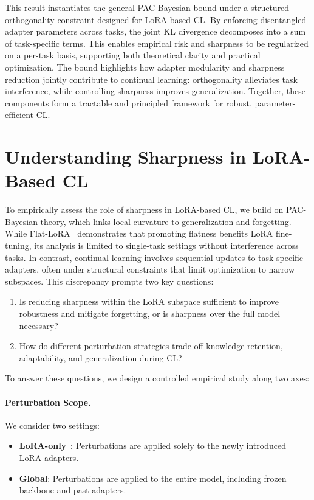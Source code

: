 \documentclass[letterpaper]{article} %
\begin{document}
This result instantiates the general PAC-Bayesian bound under a structured orthogonality constraint designed for LoRA-based CL. By enforcing disentangled adapter parameters across tasks, the joint KL divergence decomposes into a sum of task-specific terms. This enables empirical risk and sharpness to be regularized on a per-task basis, supporting both theoretical clarity and practical optimization. The bound highlights how adapter modularity and sharpness reduction jointly contribute to continual learning: orthogonality alleviates task interference, while controlling sharpness improves generalization. Together, these components form a tractable and principled framework for robust, parameter-efficient CL.


\section{Understanding Sharpness in LoRA-Based CL}
\label{sec:Understanding Flatness in LoRA-Based CL}


To empirically assess the role of sharpness in LoRA-based CL, we build on PAC-Bayesian theory, which links local curvature to generalization and forgetting. While Flat-LoRA~\cite{li2025flatloralowrankadaptationflat} demonstrates that promoting flatness benefits LoRA fine-tuning, its analysis is limited to single-task settings without interference across tasks. In contrast, continual learning involves sequential updates to task-specific adapters, often under structural constraints that limit optimization to narrow subspaces. This discrepancy prompts two key questions:
\begin{enumerate}
    \item Is reducing sharpness within the LoRA subspace sufficient to improve robustness and mitigate forgetting, or is sharpness over the full model necessary?
    \item How do different perturbation strategies trade off knowledge retention, adaptability, and generalization during CL?
\end{enumerate}


To answer these questions, we design a controlled empirical study along two axes:
\paragraph{Perturbation Scope.} We consider two settings:
\begin{itemize}
    \item \textbf{LoRA-only}~\cite{li2025flatloralowrankadaptationflat}: Perturbations are applied solely to the newly introduced LoRA adapters.
    \item \textbf{Global}: Perturbations are applied to the entire model, including frozen backbone and past adapters.
\end{itemize}
\end{document}
